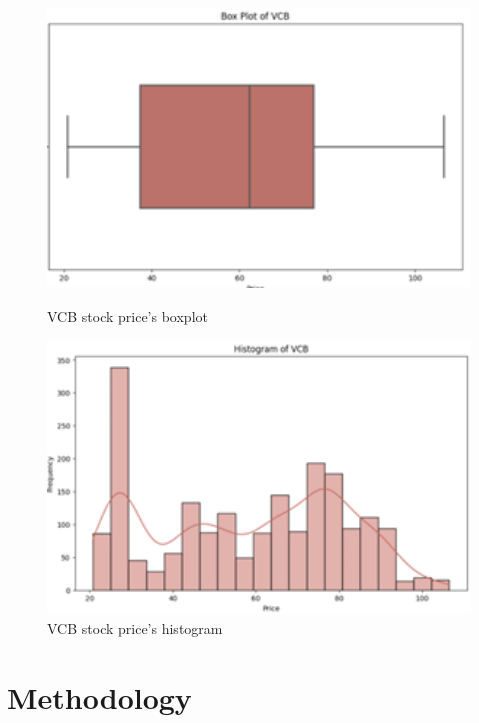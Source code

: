 \documentclass{ieeeojies}
\begin{document}
\begin{figure}[H]
    \centering
    \begin{minipage}{0.23\textwidth}
    \centering
    \includegraphics[width=1\textwidth]{bibliography/Figure/VCBboxplot.png}
    \caption{VCB stock price's boxplot}
    \label{fig:1}
    \end{minipage}
    \hfill
    \begin{minipage}{0.23\textwidth}
    \centering
    \includegraphics[width=1\textwidth]{bibliography/Figure/VCBhist.png}
    \caption{VCB stock price's histogram}
    \label{fig:2}
    \end{minipage}
\end{figure}

\section{Methodology}
\end{document}
